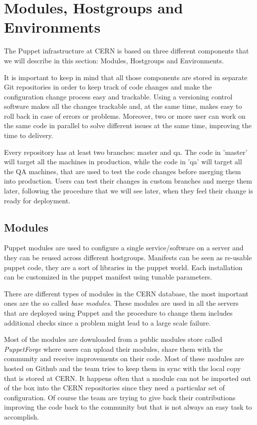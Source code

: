 \section{Modules, Hostgroups and Environments}

The Puppet infrastructure at CERN is based on three different components
that we will describe in this section: Modules, Hostgroups and
Environments.

It is important to keep in mind that all those components are stored in
separate Git repositories in order to keep track of code changes and make
the configuration change process easy and trackable. Using a versioning
control software makes all the changes trackable and, at the same time,
makes easy to roll back in case of errors or problems. Moreover, two or
more user can work on the same code in parallel to solve different issues
at the same time, improving the time to delivery.

Every repository has at least two branches: master and qa. The code in
'master' will target all the machines in production, while the code in
'qa' will target all the QA machines, that are used to test the code
changes before merging them into production. Users can test their changes
in custom branches and merge them later, following the procedure that we
will see later, when they feel their change is ready for deployment.

\subsection{Modules}

Puppet modules are used to configure a single service/software on a server
and they can be reused across different hostgroups. Manifests can be seen
as re-usable puppet code, they are a sort of libraries in the puppet
world. Each installation can be customized in the puppet manifest using
tunable parameters.

There are different types of modules in the CERN database, the most
important ones are the so called \textit{base modules}. These modules are
used in all the servers that are deployed using Puppet and the procedure
to change them includes additional checks since a problem might lead to
a large scale failure.

Most of the modules are downloaded from a public modules store called
\textit{PuppetForge} where users can upload their modules, share them with
the community and receive improvements on their code. Most of these
modules are hosted on Github and the team tries to keep them in sync with
the local copy that is stored at CERN. It happens often that a module can
not be imported out of the box into the CERN repositories since they need
a particular set of configuration. Of course the team are trying to give
back their contributions improving the code back to the community but that
is not always an easy task to accomplish.

